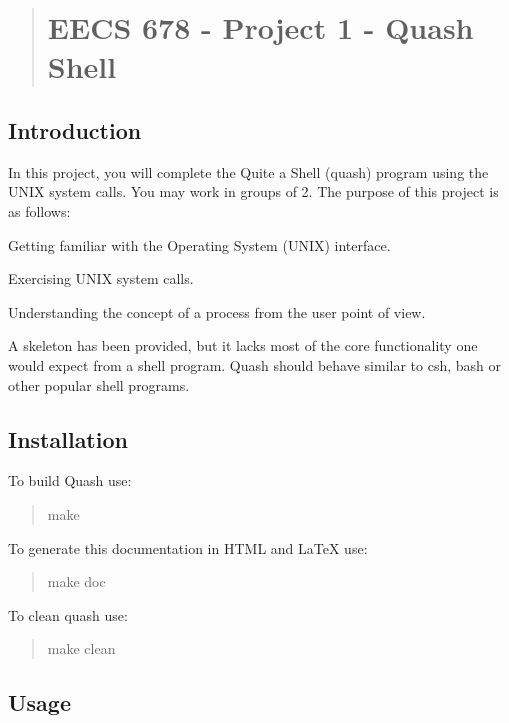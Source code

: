\begin{quotation}
\section*{E\-E\-C\-S 678 -\/ Project 1 -\/ Quash Shell}



\end{quotation}


\subsection*{Introduction}

In this project, you will complete the Quite a Shell (quash) program using the U\-N\-I\-X system calls. You may work in groups of 2. The purpose of this project is as follows\-:


\begin{DoxyItemize}
\item Getting familiar with the Operating System (U\-N\-I\-X) interface.
\item Exercising U\-N\-I\-X system calls.
\item Understanding the concept of a process from the user point of view.
\end{DoxyItemize}

A skeleton has been provided, but it lacks most of the core functionality one would expect from a shell program. Quash should behave similar to csh, bash or other popular shell programs.

\subsection*{Installation}

To build Quash use\-: \begin{quotation}
{\ttfamily make}

\end{quotation}


To generate this documentation in H\-T\-M\-L and La\-Te\-X use\-: \begin{quotation}
{\ttfamily make doc}

\end{quotation}


To clean quash use\-: \begin{quotation}
{\ttfamily make clean}

\end{quotation}


\subsection*{Usage}

